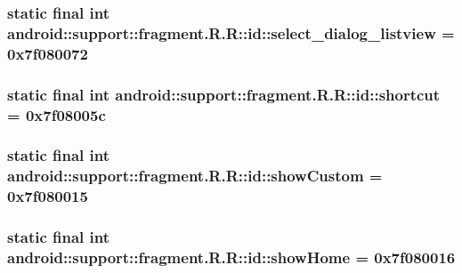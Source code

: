 \hypertarget{classandroid_1_1support_1_1fragment_1_1_r_1_1id_253f9e4e4405c72c85dff8b906d2be48}{
\subsubsection[{select\_\-dialog\_\-listview}]{\setlength{\rightskip}{0pt plus 5cm}static final int android::support::fragment.R.R::id::select\_\-dialog\_\-listview = 0x7f080072}}
\label{classandroid_1_1support_1_1fragment_1_1_r_1_1id_253f9e4e4405c72c85dff8b906d2be48}


\hypertarget{classandroid_1_1support_1_1fragment_1_1_r_1_1id_8148651a012c077335ae277b5c038a9f}{
\subsubsection[{shortcut}]{\setlength{\rightskip}{0pt plus 5cm}static final int android::support::fragment.R.R::id::shortcut = 0x7f08005c}}
\label{classandroid_1_1support_1_1fragment_1_1_r_1_1id_8148651a012c077335ae277b5c038a9f}


\hypertarget{classandroid_1_1support_1_1fragment_1_1_r_1_1id_1f5cb52148b17dc6942637eee93f47e7}{
\subsubsection[{showCustom}]{\setlength{\rightskip}{0pt plus 5cm}static final int android::support::fragment.R.R::id::showCustom = 0x7f080015}}
\label{classandroid_1_1support_1_1fragment_1_1_r_1_1id_1f5cb52148b17dc6942637eee93f47e7}


\hypertarget{classandroid_1_1support_1_1fragment_1_1_r_1_1id_eb7cf67c1cd6187c699944bf44df6746}{
\subsubsection[{showHome}]{\setlength{\rightskip}{0pt plus 5cm}static final int android::support::fragment.R.R::id::showHome = 0x7f080016}}
\label{classandroid_1_1support_1_1fragment_1_1_r_1_1id_eb7cf67c1cd6187c699944bf44df6746}


